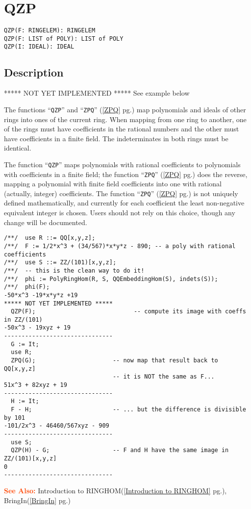\documentclass[a4paper]{mybook}
\newenvironment{command}{}{} %
\newcommand\SeeAlso{\par\textcolor{OrangeRed}{\textbf{\large See Also: }}}
\begin{document}
\section{QZP}
\label{QZP}
\begin{command} %


\begin{Verbatim}[label=syntax, rulecolor=\color{MidnightBlue},
frame=single]
QZP(F: RINGELEM): RINGELEM
QZP(F: LIST of POLY): LIST of POLY
QZP(I: IDEAL): IDEAL
\end{Verbatim}


\subsection*{Description}

***** NOT YET IMPLEMENTED *****
See example below
\par 
The functions ``\verb&QZP&'' and ``\verb&ZPQ&'' (\ref{ZPQ} pg.\pageref{ZPQ}) map polynomials and
ideals of other rings into ones of the current ring.
When mapping from one ring to another, one of the rings must have
coefficients in the rational numbers and the other must have
coefficients in a finite field.  The indeterminates in both
rings must be identical.
\par 
The function ``\verb&QZP&'' maps polynomials with rational coefficients to
polynomials with coefficients in a finite field; the function ``\verb&ZPQ&'' (\ref{ZPQ} pg.\pageref{ZPQ})
does the reverse, mapping a polynomial with finite field coefficients
into one with rational (actually, integer) coefficients.  The function
``\verb&ZPQ&'' (\ref{ZPQ} pg.\pageref{ZPQ}) is not uniquely defined mathematically, and currently for each
coefficient the least non-negative equivalent integer is chosen.
Users should not rely on this choice, though any change will be
documented.
\begin{Verbatim}[label=example, rulecolor=\color{PineGreen}, frame=single]
/**/  use R ::= QQ[x,y,z];
/**/  F := 1/2*x^3 + (34/567)*x*y*z - 890; -- a poly with rational coefficients
/**/  use S ::= ZZ/(101)[x,y,z];
/**/  -- this is the clean way to do it!
/**/  phi := PolyRingHom(R, S, QQEmbeddingHom(S), indets(S));
/**/  phi(F);
-50*x^3 -19*x*y*z +19
***** NOT YET IMPLEMENTED *****
  QZP(F);                            -- compute its image with coeffs in ZZ/(101)
-50x^3 - 19xyz + 19
-------------------------------
  G := It;
  use R;
  ZPQ(G);                      -- now map that result back to QQ[x,y,z]
                               -- it is NOT the same as F...
51x^3 + 82xyz + 19
-------------------------------
  H := It;
  F - H;                       -- ... but the difference is divisible by 101
-101/2x^3 - 46460/567xyz - 909
-------------------------------
  use S;
  QZP(H) - G;                  -- F and H have the same image in ZZ/(101)[x,y,z]
0
-------------------------------
\end{Verbatim}


\SeeAlso %
  Introduction to RINGHOM(\ref{Introduction to RINGHOM} pg.\pageref{Introduction to RINGHOM}), 
    BringIn(\ref{BringIn} pg.\pageref{BringIn})
\end{command} %
\end{document}
